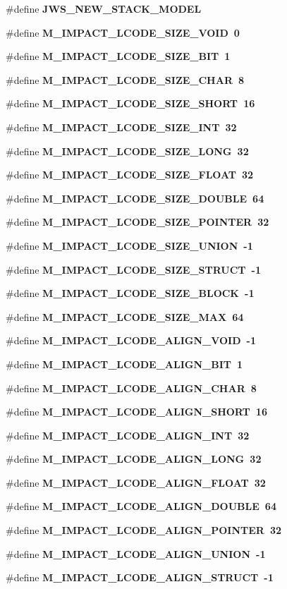\begin{CompactItemize}
\item 
\#define \bf{JWS\_\-NEW\_\-STACK\_\-MODEL}
\item 
\#define \bf{M\_\-IMPACT\_\-LCODE\_\-SIZE\_\-VOID}~0
\item 
\#define \bf{M\_\-IMPACT\_\-LCODE\_\-SIZE\_\-BIT}~1
\item 
\#define \bf{M\_\-IMPACT\_\-LCODE\_\-SIZE\_\-CHAR}~8
\item 
\#define \bf{M\_\-IMPACT\_\-LCODE\_\-SIZE\_\-SHORT}~16
\item 
\#define \bf{M\_\-IMPACT\_\-LCODE\_\-SIZE\_\-INT}~32
\item 
\#define \bf{M\_\-IMPACT\_\-LCODE\_\-SIZE\_\-LONG}~32
\item 
\#define \bf{M\_\-IMPACT\_\-LCODE\_\-SIZE\_\-FLOAT}~32
\item 
\#define \bf{M\_\-IMPACT\_\-LCODE\_\-SIZE\_\-DOUBLE}~64
\item 
\#define \bf{M\_\-IMPACT\_\-LCODE\_\-SIZE\_\-POINTER}~32
\item 
\#define \bf{M\_\-IMPACT\_\-LCODE\_\-SIZE\_\-UNION}~-1
\item 
\#define \bf{M\_\-IMPACT\_\-LCODE\_\-SIZE\_\-STRUCT}~-1
\item 
\#define \bf{M\_\-IMPACT\_\-LCODE\_\-SIZE\_\-BLOCK}~-1
\item 
\#define \bf{M\_\-IMPACT\_\-LCODE\_\-SIZE\_\-MAX}~64
\item 
\#define \bf{M\_\-IMPACT\_\-LCODE\_\-ALIGN\_\-VOID}~-1
\item 
\#define \bf{M\_\-IMPACT\_\-LCODE\_\-ALIGN\_\-BIT}~1
\item 
\#define \bf{M\_\-IMPACT\_\-LCODE\_\-ALIGN\_\-CHAR}~8
\item 
\#define \bf{M\_\-IMPACT\_\-LCODE\_\-ALIGN\_\-SHORT}~16
\item 
\#define \bf{M\_\-IMPACT\_\-LCODE\_\-ALIGN\_\-INT}~32
\item 
\#define \bf{M\_\-IMPACT\_\-LCODE\_\-ALIGN\_\-LONG}~32
\item 
\#define \bf{M\_\-IMPACT\_\-LCODE\_\-ALIGN\_\-FLOAT}~32
\item 
\#define \bf{M\_\-IMPACT\_\-LCODE\_\-ALIGN\_\-DOUBLE}~64
\item 
\#define \bf{M\_\-IMPACT\_\-LCODE\_\-ALIGN\_\-POINTER}~32
\item 
\#define \bf{M\_\-IMPACT\_\-LCODE\_\-ALIGN\_\-UNION}~-1
\item 
\#define \bf{M\_\-IMPACT\_\-LCODE\_\-ALIGN\_\-STRUCT}~-1
\item 

\end{CompactItemize}
